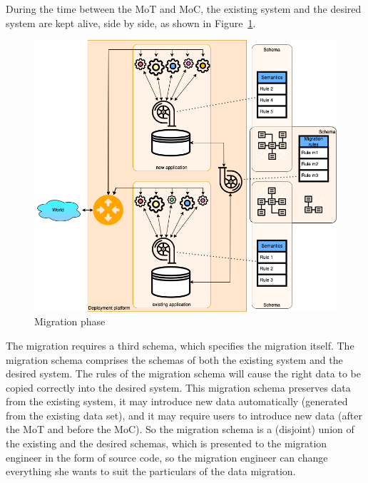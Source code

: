 \documentclass[runningheads]{llncs}
\begin{document}
   During the time between the MoT and MoC,
   the existing system and the desired system are kept alive, side by side, as shown in Figure~\ref{fig:migration phase}.
\begin{figure}[bht]
   \begin{center}
     \includegraphics[scale=.35]{figures/datamigration-Migration-phase.png}
   \end{center}
\caption{Migration phase}
\label{fig:migration phase}
\end{figure}

   The migration requires a third schema, which specifies the migration itself.
   The migration schema comprises the schemas of both the existing system and the desired system.
   The rules of the migration schema will cause the right data to be copied correctly into the desired system.
   This migration schema preserves data from the existing system, it may introduce new data automatically (generated from the existing data set),
   and it may require users to introduce new data (after the MoT and before the MoC).
   So the migration schema is a (disjoint) union of the existing and the desired schemas,
   which is presented to the migration engineer in the form of source code,
   so the migration engineer can change everything she wants to suit the particulars of the data migration.

   
\end{document}
